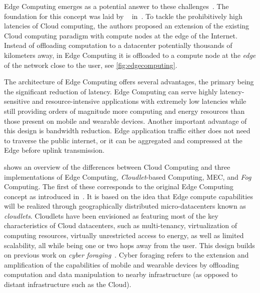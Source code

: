 \medskip
Edge Computing emerges as a potential answer to these challenges~\cite{satyanarayanan2009case,shi2016promise,shi2016edge,varghese2016challenges,satyanarayanan2017emergence,bittmann2017edge,wang2019towards}.
The foundation for this concept was laid by \citeauthor{satyanarayanan2009case}~\cite{satyanarayanan2009case} in\ \citeyear{satyanarayanan2009case}.
To tackle the prohibitively high latencies of Cloud computing, the authors proposed an extension of the existing Cloud computing paradigm with compute nodes at the edge of the Internet.
Instead of offloading computation to a datacenter potentially thousands of kilometers away, in Edge Computing it is offloaded to a compute node at the \emph{edge} of the network close to the user, see \cref{fig:edgecomputing}.

The architecture of Edge Computing offers several advantages, the primary being the significant reduction of latency.
Edge Computing can serve highly latency-sensitive and resource-intensive applications with extremely low latencies while still providing orders of magnitude more computing and energy resources than those present on mobile and wearable devices.
Another important advantage of this design is bandwidth reduction.
Edge application traffic either does not need to traverse the public internet, or it can be aggregated and compressed at the Edge before uplink transmission.



 shows an overview of the differences between Cloud Computing and three implementations of Edge Computing, \emph{Cloudlet}-based Computing, \gls{MEC}, and \emph{Fog} Computing.
The first of these corresponds to the original Edge Computing concept as introduced in~\citeauthor{satyanarayanan2009case}.
It is based on the idea that Edge compute capabilities will be realized through geographically distributed micro-datacenters known as \emph{cloudlets}.
Cloudlets have been envisioned as featuring most of the key characteristics of Cloud datacenters, such as multi-tenancy, virtualization of computing resources, virtually unrestricted access to energy, as well as limited scalability, all while being one or two hops away from the user.
This design builds on previous work on \emph{cyber foraging}~\cite{noble1997agile,flinn1999energy,satyanarayanan2001pervasive}.
Cyber foraging refers to the extension and amplification of the capabilities of mobile and wearable devices by offloading computation and data manipulation to nearby infrastructure (as opposed to distant infrastructure such as the Cloud).

